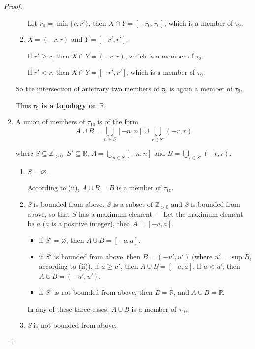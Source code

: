 \begin{proof}
\begin{enumerate}[label={(\roman*)}]
\begin{enumerate}[label={\textbf{Case \arabic*.}},itemindent=1cm]
                        Let $r_{0} = \min\{ r, r' \}$, then $X\cap Y = [-r_{0}, r_{0}]$, which is a member of $\tau_{9}$.
                  \item $X = (-r, r)$ and $Y = [-r', r']$.

                        If $r'\geq r$, then $X\cap Y = (-r, r)$, which is a member of $\tau_{9}$.

                        If $r' < r$, then $X\cap Y = [-r', r']$, which is a member of $\tau_{9}$.
              \end{enumerate}

              So the intersection of arbitrary two members of $\tau_{9}$ is again a member of $\tau_{9}$.

              Thus \textbf{$\tau_{9}$ is a topology on $\mathbb{R}$}.
        \item A union of members of $\tau_{10}$ is of the form
              \[
                  A\cup B = \bigcup_{n\in S} [-n, n] \cup \bigcup_{r\in S'} (-r, r)
              \]

              where $S\subseteq\mathbb{Z}_{> 0}$, $S'\subseteq\mathbb{R}$, $A = \bigcup_{n\in S} [-n, n]$ and $B = \bigcup_{r\in S'} (-r, r)$.
              \begin{enumerate}[label={\textbf{Case \arabic*.}},itemindent=1cm]
                  \item $S = \varnothing$.

                        According to (ii), $A\cup B = B$ is a member of $\tau_{10}$.
                  \item $S$ is bounded from above.
                        $S$ is a subset of $\mathbb{Z}_{> 0}$ and $S$ is bounded from above, so that $S$ has a maximum element --- Let the maximum element be $a$ ($a$ is a positive integer), then $A = [-a, a]$.
                        \begin{itemize}
                            \item if $S' = \varnothing$, then $A\cup B = [-a, a]$.
                            \item if $S'$ is bounded from above, then $B = (-u', u')$ (where $u' = \sup B$, according to (ii)). If $a\geq u'$, then $A\cup B = [-a, a]$. If $a < u'$, then $A\cup B = (-u', u')$.
                            \item if $S'$ is not bounded from above, then $B = \mathbb{R}$, and $A\cup B = \mathbb{R}$.
                        \end{itemize}

                        In any of these three cases, $A\cup B$ is a member of $\tau_{10}$.
                  \item $S$ is not bounded from above.


\end{enumerate}
\end{enumerate}
\end{proof}
